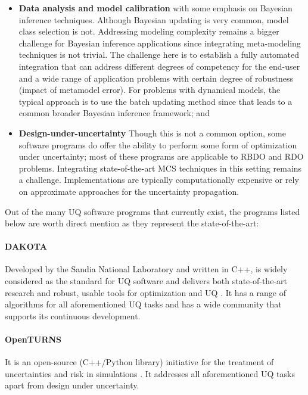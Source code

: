 \begin{itemize}
    \item \textbf{Data analysis and model calibration} with some emphasis on Bayesian inference techniques. Although Bayesian updating is very common, model class selection is not. Addressing modeling complexity remains a bigger challenge for Bayesian inference applications since integrating meta-modeling techniques is not trivial. The challenge here is to establish a fully automated integration that can address different degrees of competency for the end-user and a wide range of application problems with certain degree of robustness (impact of metamodel error). For problems with dynamical models, the typical approach is to use the batch updating method since that leads to a common broader Bayesian inference framework; and

    \item \textbf{Design-under-uncertainty} Though this is not a common option, some software programs do offer the ability to perform some form of optimization under uncertainty; most of these programs are applicable to RBDO and RDO problems. Integrating state-of-the-art MCS techniques in this setting remains a challenge. Implementations are typically computationally expensive or rely on approximate approaches for the uncertainty propagation.
\end{itemize}

\noindent Out of the many UQ software programs that currently exist, the programs listed below are worth direct mention as they represent the state-of-the-art: 

\paragraph{DAKOTA} Developed by the Sandia National Laboratory and written in C++,  is widely considered as the standard for UQ software and delivers both state-of-the-art research and robust, usable tools for optimization and UQ \citep{adams2009dakota}. It has a range of algorithms for all aforementioned UQ tasks and has a wide community that supports its continuous development. 

\paragraph{OpenTURNS} It is an open-source (C++/Python library) initiative for the treatment of uncertainties and risk in simulations \citep{andrianov2007open}. It addresses all aforementioned UQ tasks apart from design under uncertainty. 

